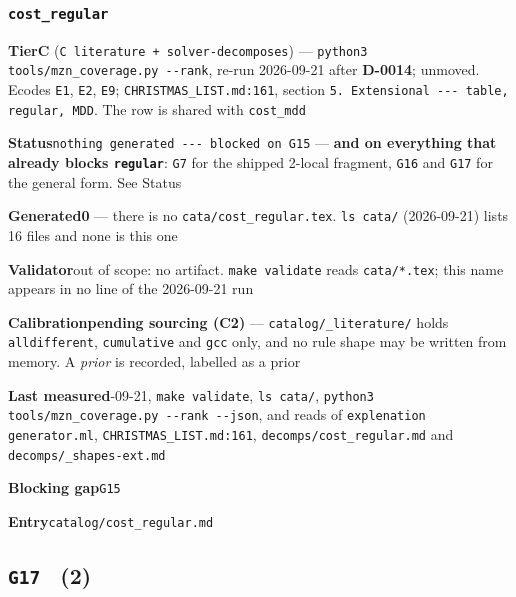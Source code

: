 \documentclass[10pt,a4paper]{article}
\newcommand{\entryfield}[2]{{\raggedright\textbf{#1}\quad #2\par}}
\begin{document}
\subsubsection*{\texttt{cost\_\allowbreak{}regular}}
\label{entry:cost-regular}
\entryfield{Tier}{\textbf{C} (\texttt{C literature + solver-\allowbreak{}decomposes}) --- \texttt{python3 tools/\allowbreak{}mzn\_\allowbreak{}coverage.\allowbreak{}py -\allowbreak{}-\allowbreak{}rank}, re-run 2026-09-21 after \textbf{D-0014}; unmoved. Ecodes \texttt{E1}, \texttt{E2}, \texttt{E9}; \texttt{CHRISTMAS\_LIST.md:161}, section \texttt{5.\allowbreak{} Extensional -\allowbreak{}-\allowbreak{}-\allowbreak{} table, regular, MDD}. The row is shared with \texttt{cost\_mdd}}
\entryfield{Status}{\texttt{nothing generated -\allowbreak{}-\allowbreak{}-\allowbreak{} blocked on G15} --- \textbf{and on everything that already blocks \texttt{regular}}: \texttt{G7} for the shipped 2-local fragment, \texttt{G16} and \texttt{G17} for the general form. See Status}
\entryfield{Generated}{\textbf{0} --- there is no \texttt{cata/cost\_regular.tex}. \texttt{ls cata/} (2026-09-21) lists 16 files and none is this one}
\entryfield{Validator}{out of scope: no artifact. \texttt{make validate} reads \texttt{cata/*.tex}; this name appears in no line of the 2026-09-21 run}
\entryfield{Calibration}{\textbf{pending sourcing (C2)} --- \texttt{catalog/\_literature/} holds \texttt{alldifferent}, \texttt{cumulative} and \texttt{gcc} only, and no rule shape may be written from memory. A \emph{prior} is recorded, labelled as a prior}
\entryfield{Last measured}{2026-09-21, \texttt{make validate}, \texttt{ls cata/}, \texttt{python3 tools/\allowbreak{}mzn\_\allowbreak{}coverage.\allowbreak{}py -\allowbreak{}-\allowbreak{}rank -\allowbreak{}-\allowbreak{}json}, and reads of \texttt{explenation generator.ml}, \texttt{CHRISTMAS\_LIST.md:161}, \texttt{decomps/cost\_regular.md} and \texttt{decomps/\_shapes-ext.md}}
\entryfield{Blocking gap}{\texttt{G15}}
\entryfield{Entry}{\texttt{catalog/cost\_regular.md}}
\subsection*{\texttt{G17} \ \normalsize(2)}
\end{document}
